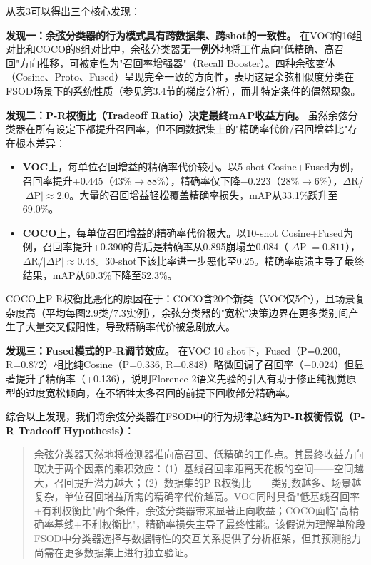 \documentclass[zihao=5,a4paper,twocolumn]{ctexart}
\begin{document}
从表3可以得出三个核心发现：

\textbf{发现一：余弦分类器的行为模式具有跨数据集、跨shot的一致性。} 在VOC的16组对比和COCO的8组对比中，余弦分类器\textbf{无一例外}地将工作点向"低精确、高召回"方向推移，可被定性为"召回率增强器"（Recall Booster）。四种余弦变体（Cosine、Proto、Fused）呈现完全一致的方向性，表明这是余弦相似度分类在FSOD场景下的系统性质（参见第3.4节的梯度分析），而非特定条件的偶然现象。

\textbf{发现二：P-R权衡比（Tradeoff Ratio）决定最终mAP收益方向。} 虽然余弦分类器在所有设定下都提升召回率，但不同数据集上的"精确率代价/召回增益比"存在根本差异：

\begin{itemize}
\item \textbf{VOC}上，每单位召回增益的精确率代价较小。以5-shot Cosine+Fused为例，召回率提升+0.445（43\%$\rightarrow$88\%），精确率仅下降$-$0.223（28\%$\rightarrow$6\%），$\Delta$R/$|\Delta$P$| \approx 2.0$。大量的召回增益轻松覆盖精确率损失，mAP从33.1\%跃升至69.0\%。
\item \textbf{COCO}上，每单位召回增益的精确率代价极大。以10-shot Cosine+Fused为例，召回率提升+0.390的背后是精确率从0.895崩塌至0.084（$|\Delta$P$|=0.811$），$\Delta$R/$|\Delta$P$| \approx 0.48$。30-shot下该比率进一步恶化至0.25。精确率崩溃主导了最终结果，mAP从60.3\%下降至52.3\%。
\end{itemize}

COCO上P-R权衡比恶化的原因在于：COCO含20个新类（VOC仅5个），且场景复杂度高（平均每图2.9类/7.3实例），余弦分类器的"宽松"决策边界在更多类别间产生了大量交叉假阳性，导致精确率代价被急剧放大。

\textbf{发现三：Fused模式的P-R调节效应。} 在VOC 10-shot下，Fused（P=0.200, R=0.872）相比纯Cosine（P=0.336, R=0.848）略微回调了召回率（$-$0.024）但显著提升了精确率（+0.136），说明Florence-2语义先验的引入有助于修正纯视觉原型的过度宽松倾向，在不牺牲太多召回的前提下回收部分精确率。

综合以上发现，我们将余弦分类器在FSOD中的行为规律总结为\textbf{P-R权衡假说（P-R Tradeoff Hypothesis）}：

\begin{quote}
余弦分类器天然地将检测器推向高召回、低精确的工作点。其最终收益方向取决于两个因素的乘积效应：（1）基线召回率距离天花板的空间——空间越大，召回提升潜力越大；（2）数据集的P-R权衡比——类别数越多、场景越复杂，单位召回增益所需的精确率代价越高。VOC同时具备"低基线召回率+有利权衡比"两个条件，余弦分类器带来显著正向收益；COCO面临"高精确率基线+不利权衡比"，精确率损失主导了最终性能。该假说为理解单阶段FSOD中分类器选择与数据特性的交互关系提供了分析框架，但其预测能力尚需在更多数据集上进行独立验证。
\end{quote}
\end{document}
